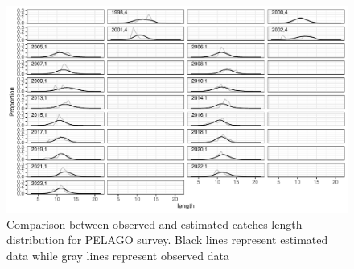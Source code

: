 \documentclass[review]{elsarticle}
\begin{document}
\begin{figure}[h!]
 \centering
 \includegraphics[bb=0 0 595 697]{./peldist.pdf}
 \caption{ Comparison between observed and estimated catches length distribution for PELAGO survey. Black lines represent estimated data while gray lines represent observed data}
 \label{peldist}
\end{figure}



\end{document}

